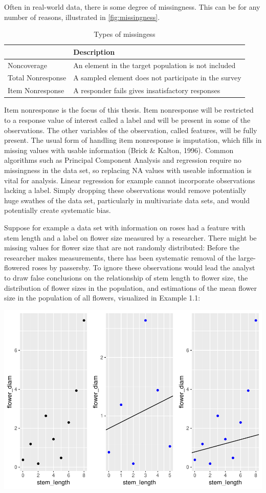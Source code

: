 \documentclass[12pt,twoside]{reedthesis}
\begin{document}
Often in real-world data, there is some degree of missingness. This can
be for any number of reasons, illustrated in \ref{fig:missingness}.
\begin{table}[t]

\caption{\label{tab:missingness}Types of missingess}
\centering
\begin{tabular}{l|l}
\hline
  & Description\\
\hline
Noncoverage & An element in the target population is not included\\
\hline
Total Nonresponse & A sampled element does not participate in the survey\\
\hline
Item Nonresponse & A responder fails gives insatisfactory responses\\
\hline
\end{tabular}
\end{table}
Item nonresponse is the focus of this thesis. Item nonresponse will be
restricted to a response value of interest called a label and will be
present in some of the observations. The other variables of the
observation, called features, will be fully present. The usual form of
handling item nonresponse is imputation, which fills in missing values
with usable information (Brick \& Kalton, 1996). Common algorithms such
as Principal Component Analysis and regression require no missingness in
the data set, so replacing NA values with useable information is vital
for analysis. Linear regression for example cannot incorporate
observations lacking a label. Simply dropping these observations would
remove potentially huge swathes of the data set, particularly in
multivariate data sets, and would potentially create systematic bias.

Suppose for example a data set with information on roses had a feature
with stem length and a label on flower size measured by a researcher.
There might be missing values for flower size that are not randomly
distributed: Before the researcher makes measurements, there has been
systematic removal of the large-flowered roses by passersby. To ignore
these observations would lead the analyst to draw false conclusions on
the relationship of stem length to flower size, the distribution of
flower sizes in the population, and estimations of the mean flower size
in the population of all flowers, visualized in Example 1.1:

\includegraphics[width=0.9\linewidth]{thesis_files/figure-latex/systematic-1}
\end{document}
